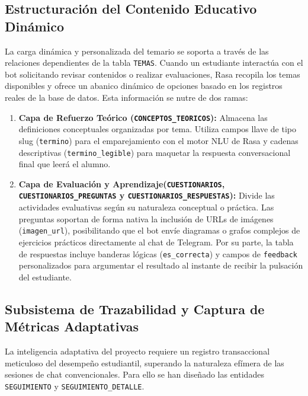 \documentclass[a4paper,12pt,twoside,final]{book}
\begin{document}
\subsection{Estructuración del Contenido Educativo Dinámico}
La carga dinámica y personalizada del temario se soporta a través de las relaciones dependientes de la tabla \texttt{TEMAS}. Cuando un estudiante interactúa con el bot solicitando revisar contenidos o realizar evaluaciones, Rasa recopila los temas disponibles y ofrece un abanico dinámico de opciones basado en los registros reales de la base de datos. Esta información se nutre de dos ramas:
\begin{enumerate}
    \item \textbf{Capa de Refuerzo Teórico (\texttt{CONCEPTOS\_TEORICOS}):} Almacena las definiciones conceptuales organizadas por tema. Utiliza campos llave de tipo slug (\texttt{termino}) para el emparejamiento con el motor NLU de Rasa y cadenas descriptivas (\texttt{termino\_legible}) para maquetar la respuesta conversacional final que leerá el alumno.
    
    \item \textbf{Capa de Evaluación y Aprendizaje(\texttt{CUESTIONARIOS}, \texttt{CUESTIONARIOS\_PREGUNTAS} y \texttt{CUESTIONARIOS\_RESPUESTAS}):} Divide las actividades evaluativas según su naturaleza conceptual o práctica. Las preguntas soportan de forma nativa la inclusión de URLs de imágenes (\texttt{imagen\_url}), posibilitando que el bot envíe diagramas o grafos complejos de ejercicios prácticos directamente al chat de Telegram. Por su parte, la tabla de respuestas incluye banderas lógicas (\texttt{es\_correcta}) y campos de \texttt{feedback} personalizados para argumentar el resultado al instante de recibir la pulsación del estudiante.
\end{enumerate}

\subsection{Subsistema de Trazabilidad y Captura de Métricas Adaptativas}
La inteligencia adaptativa del proyecto requiere un registro transaccional meticuloso del desempeño estudiantil, superando la naturaleza efímera de las sesiones de chat convencionales. Para ello se han diseñado las entidades \texttt{SEGUIMIENTO} y \texttt{SEGUIMIENTO\_DETALLE}.\\
\end{document}
